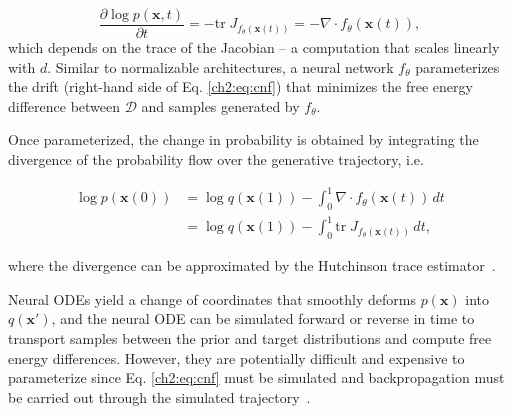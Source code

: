 \begin{equation}
    \label{ch2:eq:probability-flow}
    \frac{\partial \log p(\mathbf{x}, t)}{\partial t} = -\mathrm{tr}\;  J_{f_\theta(\mathbf{x}(t))} = - \nabla \cdot f_\theta(\mathbf{x}(t)),
\end{equation}
which depends on the trace of the Jacobian -- a computation that scales linearly with $d$. Similar to normalizable architectures, a neural network $f_\theta$ parameterizes the drift (right-hand side of Eq. \ref{ch2:eq:cnf}) that minimizes the free energy difference between $\mathcal{D}$ and samples generated by $f_\theta$. 

Once parameterized, the change in probability is obtained by integrating the divergence of the probability flow over the generative trajectory, i.e.

\begin{equation}
    \label{ch2:eq:cnf-free-energy}
    \begin{aligned}
        \log p(\mathbf{x}(0)) &= \log q(\mathbf{x}(1)) - \int_0^1 \nabla \cdot f_\theta(\mathbf{x}(t))\,dt \\
        &= \log q(\mathbf{x}(1)) - \int_0^1 \mathrm{tr}\; J_{f_\theta(\mathbf{x}(t))}\,dt,
    \end{aligned}
\end{equation}

where the divergence can be approximated by the Hutchinson trace estimator~\cite{hutchinson1989stochastic}.

Neural ODEs yield a change of coordinates that smoothly deforms $p(\mathbf{x})$ into $q(\mathbf{x}')$, and the neural ODE can be simulated forward or reverse in time to transport samples between the prior and target distributions and compute free energy differences. However, they are potentially difficult and expensive to parameterize since Eq. \ref{ch2:eq:cnf} must be simulated and backpropagation must be carried out through the simulated trajectory~\cite{NeuralODE}.

